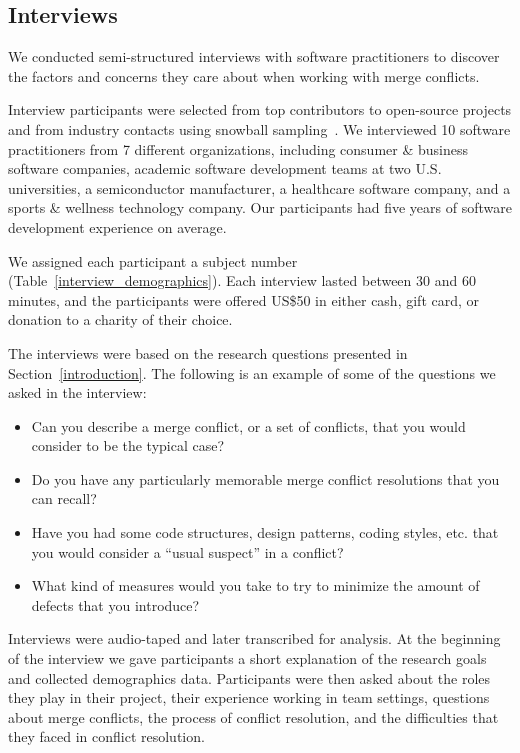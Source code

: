 \subsection{Interviews}\label{interview_methods}

We conducted semi-structured interviews with software practitioners to discover the factors and concerns they care about when working with merge conflicts.

Interview participants were selected from top contributors to open-source projects and from industry contacts using snowball sampling~\cite{goodman1961snowball}.
We interviewed 10 software practitioners from 7 different organizations, including consumer \& business software companies, academic software development teams at two U.S. universities, a semiconductor manufacturer, a healthcare software company, and a sports \& wellness technology company.
Our participants had five years of software development experience on average.

We assigned each participant a subject number (Table~\ref{interview_demographics}).
Each interview lasted between 30 and 60 minutes, and the participants were offered US\$50 in either cash, gift card, or donation to a charity of their choice.

The interviews were based on the research questions presented in Section~\ref{introduction}.
The following is an example of some of the questions we asked in the interview:
\begin{itemize}
	\item Can you describe a merge conflict, or a set of conflicts, that you would consider to be the typical case?
	\item Do you have any particularly memorable merge conflict resolutions that you can recall?
	\item Have you had some code structures, design patterns, coding styles, etc. that you would consider a ``usual suspect'' in a conflict?
	\item What kind of measures would you take to try to minimize the amount of defects that you introduce?
\end{itemize}  

Interviews were audio-taped and later transcribed for analysis. 
At the beginning of the interview we gave participants a short explanation of the research goals and collected demographics data. 
Participants were then asked about the roles they play in their project, their experience working in team settings,  questions about merge conflicts, the process of conflict resolution, and the difficulties that they faced in conflict resolution. 

